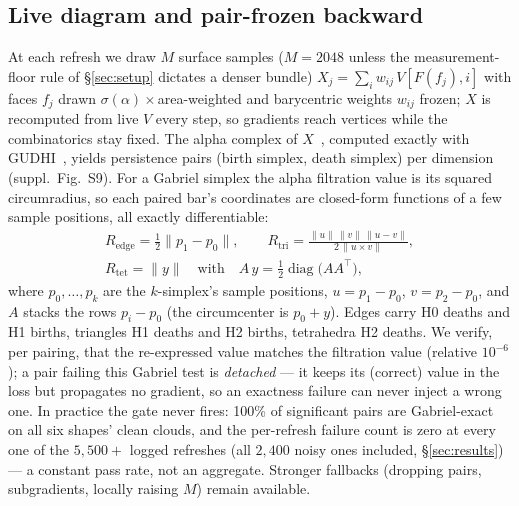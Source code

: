 \subsection{Live diagram and pair-frozen backward}
At each refresh we draw $M$ surface samples ($M{=}2048$ unless the
measurement-floor rule of \S\ref{sec:setup} dictates a denser bundle)
$X_j=\sum_i w_{ij}\,V[F(f_j),i]$ with faces $f_j$ drawn
$\sigma(\alpha)\times$area-weighted and barycentric weights $w_{ij}$ frozen;
$X$ is recomputed from live $V$ every step, so gradients reach vertices while
the combinatorics stay fixed. The alpha complex of
$X$~\citep{edelsbrunner1994alphashapes}, computed exactly with
GUDHI~\citep{maria2014gudhi}, yields persistence
pairs (birth simplex, death simplex) per dimension (suppl.\ Fig.~S9). For a Gabriel simplex the
alpha filtration value is its squared circumradius, so each paired bar's
coordinates are closed-form functions of a few sample positions, all
exactly differentiable:
\begin{equation}
\begin{gathered}
R_{\mathrm{edge}}=\tfrac12\lVert p_1{-}p_0\rVert,\qquad
R_{\mathrm{tri}}=\frac{\lVert u\rVert\,\lVert v\rVert\,\lVert u{-}v\rVert}
                      {2\,\lVert u\times v\rVert},\\[2pt]
R_{\mathrm{tet}}=\lVert y\rVert\quad\text{with}\quad
A\,y=\tfrac12\operatorname{diag}\!\big(AA^{\!\top}\big),
\end{gathered}
\end{equation}
where $p_0,\dots,p_k$ are the $k$-simplex's sample positions,
$u=p_1{-}p_0$, $v=p_2{-}p_0$, and $A$ stacks the rows $p_i{-}p_0$
(the circumcenter is $p_0{+}y$). Edges carry H0 deaths and H1 births,
triangles H1 deaths and H2 births, tetrahedra H2 deaths.
We verify, per pairing, that the re-expressed value matches the filtration
value (relative $10^{-6}$); a pair failing this Gabriel test is
\emph{detached} --- it keeps its (correct) value in the loss but
propagates no gradient, so an exactness failure can never inject a
wrong one.
In practice the gate never fires: 100\% of significant pairs are
Gabriel-exact on all six shapes' clean clouds, and the per-refresh
failure count is zero at every one of the $5{,}500{+}$ logged refreshes
(all $2{,}400$ noisy ones included, \S\ref{sec:results}) --- a constant
pass rate, not an aggregate. Stronger fallbacks (dropping pairs, subgradients, locally
raising $M$) remain available.

